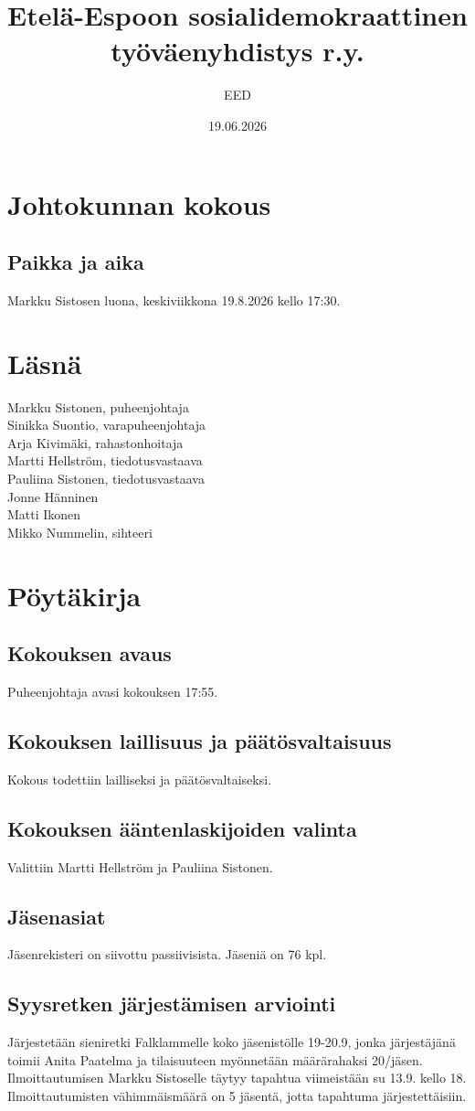 \documentclass[a4paper,12pt]{article}
\title{Etelä-Espoon sosialidemokraattinen työväenyhdistys r.y.}
\author{EED}
\date{19.06.2026}
\begin{document}
\maketitle
\tableofcontents
\section*{Johtokunnan kokous}
\subsection*{Paikka ja aika}
Markku Sistosen luona, keskiviikkona 19.8.2026 kello 17:30.
\section*{Läsnä}
Markku Sistonen, puheenjohtaja \\
Sinikka Suontio, varapuheenjohtaja \\
Arja Kivimäki, rahastonhoitaja \\
Martti Hellström, tiedotusvastaava \\
Pauliina Sistonen, tiedotusvastaava \\
Jonne Hänninen \\
Matti Ikonen \\
Mikko Nummelin, sihteeri
\section*{Pöytäkirja}
\subsection{Kokouksen avaus}
Puheenjohtaja avasi kokouksen 17:55.
\subsection{Kokouksen laillisuus ja päätösvaltaisuus}
Kokous todettiin lailliseksi ja päätösvaltaiseksi.
\subsection{Kokouksen ääntenlaskijoiden valinta}
Valittiin Martti Hellström ja Pauliina Sistonen.
\subsection{Jäsenasiat}
Jäsenrekisteri on siivottu passiivisista. Jäseniä on 76 kpl.
\subsection{Syysretken järjestämisen arviointi}
Järjestetään sieniretki Falklammelle koko jäsenistölle 19-20.9, jonka järjestäjänä toimii Anita Paatelma ja tilaisuuteen myönnetään määrärahaksi 20\EUR{}/jäsen. Ilmoittautumisen Markku Sistoselle täytyy tapahtua viimeistään su 13.9. kello 18. Ilmoittautumisten vähimmäismäärä on 5 jäsentä, jotta tapahtuma järjestettäisiin.
\end{document}
